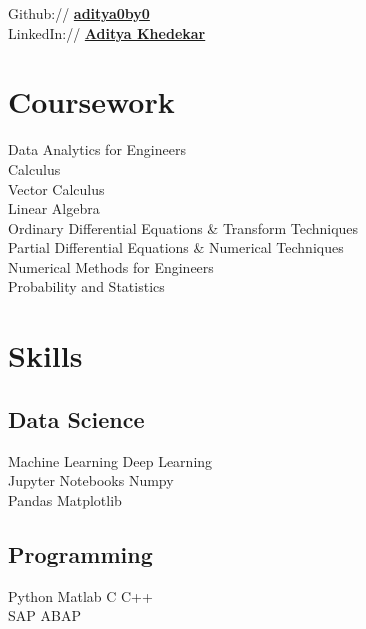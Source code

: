 \documentclass[]{deedy-resume-openfont}
\begin{document}
\begin{minipage}[t]{0.33\textwidth}
Github:// \href{https://github.com/aditya0by0}{\bf aditya0by0} \\

LinkedIn://  \href{https://www.linkedin.com/in/aditya-khedekar-b1979013b/}{\bf Aditya Khedekar} 

\sectionsep

\section{Coursework}

\vspace{5pt}

Data Analytics for Engineers \\
Calculus \\
Vector Calculus \\
Linear Algebra \\
Ordinary Differential Equations \& Transform Techniques\\
Partial Differential Equations \& \space Numerical Techniques\\
Numerical Methods for Engineers\\
Probability and Statistics\\
\sectionsep


\section{Skills}

\vspace{5pt}
\subsection{Data Science}
\vspace{2pt}
Machine Learning \textbullet{} Deep Learning\\
Jupyter Notebooks \textbullet{} Numpy \\
\textbullet{} Pandas \textbullet{} Matplotlib\\ 

\vspace{8pt}
\subsection{Programming}
\vspace{2pt}
 Python \textbullet{} Matlab \textbullet{}
C \textbullet{} C++ \\
SAP ABAP \\


\end{minipage}
\end{document}
